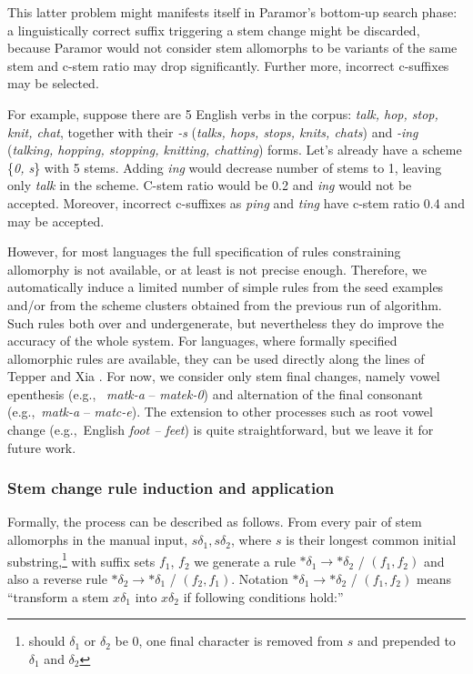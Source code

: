 \documentclass{itatnew}
\newcommand{\e}[1]{\textit{#1}} %
\newcommand{\eg}{e.g.,~}
\newcommand{\todoja}[1]{[\textbf{TODOJ} #1]}
\begin{document}
This latter problem might manifests itself in Paramor's bottom-up search phase: a linguistically correct suffix triggering a stem change might be discarded, because Paramor would not consider stem allomorphs to be variants of the same stem and c-stem ratio may drop significantly. Further more, incorrect c-suffixes may be selected.

For example, suppose there are 5 English verbs in the corpus: \emph{talk, hop, stop, knit, chat}, together with their \emph{-s} (\emph{talks, hops, stops, knits, chats}) and \emph{-ing} (\emph{talking, hopping, stopping, knitting, chatting}) forms. Let's already have a scheme \{\emph{0, s}\} with 5 stems. Adding \emph{ing} would decrease number of stems to 1, leaving only \emph{talk} in the scheme. C-stem ratio would be 0.2 and \emph{ing} would not be accepted. Moreover, incorrect c-suffixes as \emph{ping} and \emph{ting} have c-stem ratio 0.4 and may be accepted.


However, for most languages the full specification of rules constraining allomorphy is not available, or at least is not precise enough. Therefore, we automatically induce a limited number of simple rules from the seed examples and/or from the scheme clusters obtained from the previous run of algorithm. Such rules both over and undergenerate, but nevertheless they do improve the accuracy of the whole system. For languages, where formally specified allomorphic rules are available, they can be used directly along the lines of Tepper and Xia \cite{tepper10,tepper-xia-2008}.
%
For now, we consider only stem final changes, namely vowel epenthesis (\eg
\e{matk-a} -- \e{matek-0}) and alternation of the final consonant (\eg \e{matk-a} -- \e{matc-e}). The extension to other processes such as root vowel change (\eg English \e{foot -- feet}) is quite straightforward, but we leave it for future work.



\subsubsection{Stem change rule induction and application}

\noindent
Formally, the process can be described as follows.
From every pair of stem allomorphs in the manual input, $s\delta_1, s\delta_2$, where $s$ is their longest common initial substring,\footnote{should $\delta_1$ or $\delta_2$ be 0, one final character is removed from $s$ and prepended to $\delta_1$ and $\delta_2$} with suffix
sets $f_1$, $f_2$ we generate a rule $*\delta_1 \rightarrow *\delta_2$ / $(f_1, f_2)$ and also a reverse rule $*\delta_2 \rightarrow *\delta_1$ / $(f_2, f_1)$. Notation $*\delta_1 \rightarrow *\delta_2$ / $(f_1, f_2)$ means ``transform a stem $x\delta_1$ into $x\delta_2$ if following conditions hold:''
\end{document}
